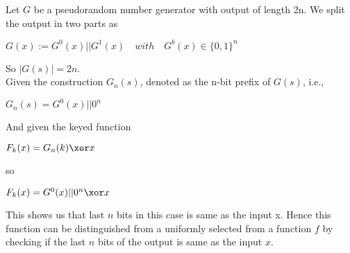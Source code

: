 Let $G$ be a pseudorandom number generator with output of length 2n. We split the output in two 
parts as 
\begin{center}
    $ G(x) := G^0(x) || G^1(x) \quad with \quad G^b(x) \in \{0,1\}^n $
\end{center}


So $ |G(s)| = 2n $.\\


Given the construction $ G_n(s) $, denoted as the n-bit prefix of $ G(s)$, i.e.,
\begin{center}
    $ G_n(s) =   G^0(x) || 0^n $
\end{center}

And given the keyed function
\begin{center}
    $ F_k(x) =   G_n(k) \xor x $
\end{center}

so
\begin{center}
    $ F_k(x) =   G^0(x) || 0^n \xor x $
\end{center}


This shows us that last $n$ bits in this case is same as the input x. Hence this function can 
be distinguished from a uniformly selected from a function $f$ by checking if the last $n$ bits of
the output is same as the input $x$.